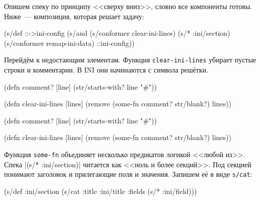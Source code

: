 Опишем спеку по принципу <<сверху вниз>>, словно все компоненты готовы. Ниже~---
композиция, которая решает задачу:

\begin{english}
  \begin{clojure}
(s/def ::->ini-config
  (s/and
   (s/conformer clear-ini-lines)
   (s/* :ini/section)
   (s/conformer remap-ini-data)
   ::ini-config))
  \end{clojure}
\end{english}


Перейдём к недостающим элементам. Функция \verb|clear-ini-lines| убирает
пустые строки и комментарии. В INI они начинаются с символа решётки.

\ifx\DEVICETYPE\MOBILE

\begin{english}
  \begin{clojure}
(defn comment? [line]
  (str/starts-with? line "#"))

(defn clear-ini-lines [lines]
  (remove
    (some-fn comment? str/blank?) lines))
  \end{clojure}
\end{english}

\else

\begin{english}
  \begin{clojure}
(defn comment? [line]
  (str/starts-with? line "#"))

(defn clear-ini-lines [lines]
  (remove (some-fn comment? str/blank?) lines))
  \end{clojure}
\end{english}

\fi


Функция \verb|some-fn| объединяет несколько предикатов логикой <<любой
из>>. Спека \spverb|(s/* :ini/section)| читается как <<ноль и более
секций>>. Под секцией понимают заголовок и прилегающие поля и значения. Запишем
её в виде \verb|s/cat|:

\ifx\DEVICETYPE\MOBILE

\begin{english}
  \begin{clojure}
(s/def :ini/section
  (s/cat :title
    :ini/title :fields (s/* :ini/field)))
  \end{clojure}
\end{english}

